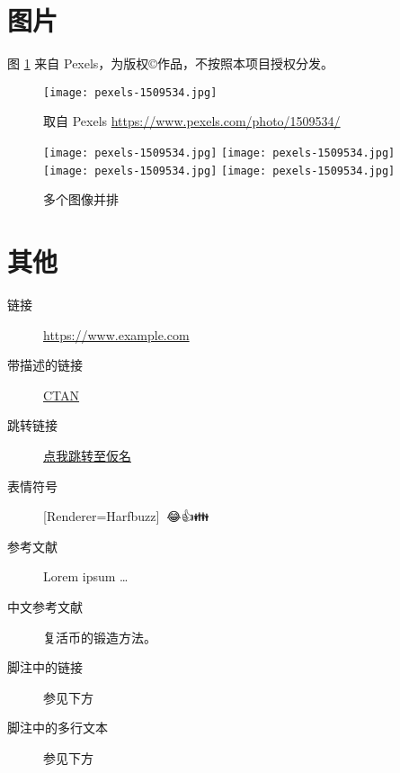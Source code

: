 \documentclass[
  fontset = none,
  punct   = kaiming,
]{ctexart}
\newcommand{\emoji}[1]{
  {\setmainfont{Apple Color Emoji}[Renderer=Harfbuzz]{#1}}
}
\let\oldurl\url
\renewcommand{\url}[1]{%
{\lmmono\oldurl{#1}}
}
\begin{document}
\newpage
\section{图片}

图 \ref{fig:example} 来自 Pexels，为版权\copyright{}作品，不按照本项目授权分发。

\begin{figure}[htbp]
  \centering
  \texttt{[image: pexels-1509534.jpg]}
  \caption{取自 Pexels \url{https://www.pexels.com/photo/1509534/}}
  \label{fig:example}
\end{figure}

\begin{figure}[htbp]
\centering
\texttt{[image: pexels-1509534.jpg]}
\texttt{[image: pexels-1509534.jpg]}
\\[\smallskipamount]
\texttt{[image: pexels-1509534.jpg]}
\texttt{[image: pexels-1509534.jpg]}
\caption{多个图像并排}
\end{figure}


\newpage
\section{其他}

\sans

\begin{description}
  \item[链接] \url{https://www.example.com}
  \item[带描述的链接] \href{https://www.ctan.org}{CTAN}
  \item[跳转链接]
    \hyperref[sec:kana]{点我跳转至{\gothic{}仮名}}
  \item[表情符号] \emoji{😶‍🌫️😂👍👪}
  \item[参考文献] Lorem ipsum \ldots \autocite{greenwade93}
  \item[中文参考文献] 复活币的锻造方法。 \autocite{bili_lex}
  \item[脚注中的链接\footnotemark] 参见下方
  \item[脚注中的多行文本\footnotemark] 参见下方
\end{description}

\printbibliography[heading=bibintoc]
\end{document}
